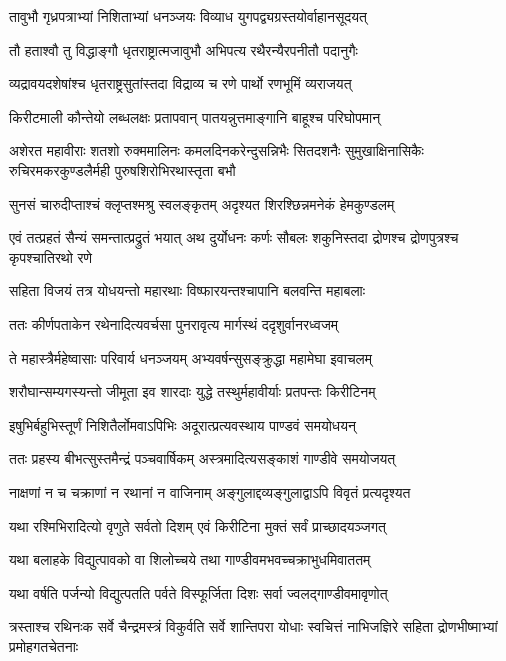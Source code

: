 \twolineshloka
{तावुभौ गृध्रपत्राभ्यां निशिताभ्यां धनञ्जयः}
{विव्याध युगपद्व्यग्रस्तयोर्वाहानसूदयत्}


\twolineshloka
{तौ हताश्वौ तु विद्धाङ्गौ धृतराष्ट्रात्मजावुभौ}
{अभिपत्य रथैरन्यैरपनीतौ पदानुगैः}


\twolineshloka
{व्यद्रावयदशेषांश्च धृतराष्ट्रसुतांस्तदा}
{विद्राव्य च रणे पार्थो रणभूमिं व्यराजयत्}


\twolineshloka
{किरीटमाली कौन्तेयो लब्धलक्षः प्रतापवान्}
{पातयन्नुत्तमाङ्गानि बाहूश्च परिघोपमान्}


\onelineshloka
{अशेरत महावीराः शतशो रुक्ममालिनः}
\twolineshloka
{कमलदिनकरेन्दुसन्निभैः सितदशनैः सुमुखाक्षिनासिकैः}
{रुचिरमकरकुण्डलैर्मही पुरुषशिरोभिरथास्तृता बभौ}


\twolineshloka
{सुनसं चारुदीप्ताश्चं क्लृप्तश्मश्रु स्वलङ्कृतम्}
{अदृश्यत शिरश्छिन्नमनेकं हेमकुण्डलम्}


\onelineshloka
{एवं तत्प्रहतं सैन्यं समन्तात्प्रद्रुतं भयात्}
\twolineshloka
{अथ दुर्योधनः कर्णः सौबलः शकुनिस्तदा}
{द्रोणश्च द्रोणपुत्रश्च कृपश्चातिरथो रणे}


\twolineshloka
{सहिता विजयं तत्र योधयन्तो महारथाः}
{विष्फारयन्तश्चापानि बलवन्ति महाबलाः}


\twolineshloka
{ततः कीर्णपताकेन रथेनादित्यवर्चसा}
{पुनरावृत्य मार्गस्थं ददृशुर्वानरध्वजम्}


\twolineshloka
{ते महास्त्रैर्महेष्वासाः परिवार्य धनञ्जयम्}
{अभ्यवर्षन्सुसङ्क्रुद्धा महामेघा इवाचलम्}


\twolineshloka
{शरौघान्सम्यगस्यन्तो जीमूता इव शारदाः}
{युद्धे तस्थुर्महावीर्याः प्रतपन्तः किरीटिनम्}


\twolineshloka
{इषुभिर्बहुभिस्तूर्णं निशितैर्लोमवाऽपिभिः}
{अदूरात्प्रत्यवस्थाय पाण्डवं समयोधयन्}


\twolineshloka
{ततः प्रहस्य बीभत्सुस्तमैन्द्रं पञ्चवार्षिकम्}
{अस्त्रमादित्यसङ्काशं गाण्डीवे समयोजयत्}


\twolineshloka
{नाक्षणां न च चक्राणां न रथानां न वाजिनाम्}
{अङ्गुलाद्दव्यङ्गुलाद्वाऽपि विवृतं प्रत्यदृश्यत}


\twolineshloka
{यथा रश्मिभिरादित्यो वृणुते सर्वतो दिशम्}
{एवं किरीटिना मुक्तं सर्वं प्राच्छादयञ्जगत्}


\twolineshloka
{यथा बलाहके विद्युत्पावको वा शिलोच्चये}
{तथा गाण्डीवमभवच्चक्राभुधमिवाततम्}


\twolineshloka
{यथा वर्षति पर्जन्यो विद्युत्पतति पर्वते}
{विस्फूर्जिता दिशः सर्वा ज्वलद्गाण्डीवमावृणोत्}


\threelineshloka
{त्रस्ताश्च रथिनःक सर्वे चैन्द्रमस्त्रं विकुर्वति}
{सर्वे शान्तिपरा योधाः स्वचित्तं नाभिजज्ञिरे}
{सहिता द्रोणभीष्माभ्यां प्रमोहगतचेतनाः}


